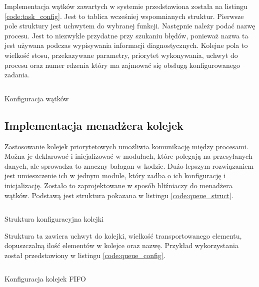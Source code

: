            Implementacja wątków zawartych w systemie przedstawiona została na listingu \ref{code:task_config}. Jest to tablica wcześniej wspomnianych struktur. Pierwsze pole struktury jest uchwytem do wybranej funkcji. Następnie należy podać nazwę procesu. Jest to niezwykle przydatne przy szukaniu błędów, ponieważ nazwa ta jest używana podczas wypisywania informacji diagnostycznych. Kolejne pola to wielkość stosu, przekazywane parametry, priorytet wykonywania, uchwyt do procesu oraz numer rdzenia który ma zajmować się obsługą konfigurowanego zadania.
            
            \begin{kod}
              \inputminted[firstline=19, lastline=60]{cpp}{esp/listings/task_mngm.cpp}
              \caption{Konfiguracja wątków}
              \label{code:task_config}
              \vspace{2em}
            \end{kod}
            
            \subsection{Implementacja menadżera kolejek}
            Zastosowanie kolejek priorytetowych umożliwia komunikację między procesami. Można je deklarować i inicjalizować w modułach, które polegają na przesyłanych danych, ale sprowadza to znaczny bałagan w kodzie. Dużo lepszym rozwiązaniem jest umieszczenie ich w jednym module, który zadba o ich konfigurację i inicjalizację. Zostało to zaprojektowane w sposób bliźniaczy do menadżera wątków. Podstawą jest struktura pokazana w listingu \ref{code:queue_struct}.
 
            \begin{kod}
              \inputminted[firstline=40, lastline=47]{cpp}{esp/listings/task_mngm.hpp}
              \caption{Struktura konfiguracyjna kolejki}
              \label{code:queue_struct}
              \vspace{2em}
            \end{kod}
            
            Struktura ta zawiera uchwyt do kolejki, wielkość transportowanego elementu, dopuszczalną ilość elementów w kolejce oraz nazwę. Przykład wykorzystania został przedstawiony w listingu \ref{code:queue_config}. 
            
            \begin{kod}
              \inputminted[firstline=63, lastline=99]{cpp}{esp/listings/task_mngm.cpp}
              \caption{Konfiguracja kolejek FIFO}
              \label{code:queue_config}
              \vspace{2em}
            \end{kod}
            
